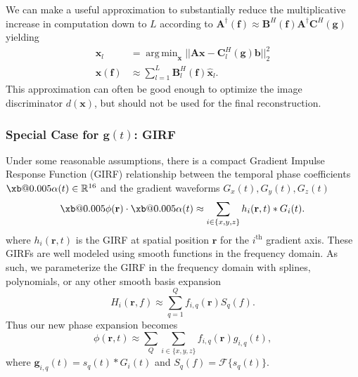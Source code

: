 \documentclass{article}
\makeatletter
\newcommand{\xbold}[2][0.005]{\mathpalette{\xb@{#1}}{#2}}
\newcommand{\xb@}[3]{%
  \sbox\z@{$\m@th#2\bm{#3}$}%
  \dimen@=#1\wd\z@
  \hbox{%
    \rlap{\kern-\dimen@\copy\z@}%
    \rlap{\kern\dimen@\copy\z@}%
    \rlap{\raise\dimen@\copy\z@}%
    \rlap{\lower\dimen@\copy\z@}%
    \copy\z@\kern\dimen@}%
}
\newcommand{\PHI}{\xbold{\phi}}
\newcommand{\ALPHA}{\xbold{\alpha}}
\DeclareMathOperator*{\argmin}{arg\,min}
\newcommand{\x}{\mathbf{x}}
\renewcommand{\r}{\mathbf{r}}
\newcommand{\f}{\mathbf{f}}
\newcommand{\g}{\mathbf{g}}
\newcommand{\A}{\mathbf{A}}
\newcommand{\C}{\mathbf{C}}
\newcommand{\B}{\mathbf{B}}
\renewcommand{\b}{\mathbf{b}}
\makeatother
\begin{document}
We can make a useful approximation to substantially reduce the multiplicative increase in computation down to $L$ according to $\A^\dagger (\f)\approx \B^H(\f) \A^\dagger \C^H(\g)$ yielding
\begin{align}
\hat{\x}_l &= \argmin_\x||\A \x - \C_l^H(\g) \b||_2^2 \\
\hat{\x}(\f) &\approx \sum_{l=1}^L \B_l^H(\f)\hat{\x}_l .
\end{align}
This approximation can often be good enough to optimize the image discriminator $d(\x)$, but should not be used for the final reconstruction.


\subsubsection{Special Case for $\g(t)$: GIRF}
Under some reasonable assumptions, there is a compact Gradient Impulse Response Function (GIRF) relationship between the temporal phase coefficients $\ALPHA(t) \in \mathbb{R}^{16}$ and the gradient waveforms $G_x(t), G_y(t), G_z(t)$
\begin{equation}
    \PHI(\r) \cdot \ALPHA(t) \approx \sum_{i \in \{x,y,z\}}h_i(\r, t) \ast G_i(t).
\end{equation}
where $h_i(\r, t)$ is the GIRF at spatial position $\r$ for the $i^\text{th}$ gradient axis. These GIRFs are well modeled using smooth functions in the frequency domain. As such, we parameterize the GIRF in the frequency domain with splines, polynomials, or any other smooth basis expansion
\begin{equation}
    H_i(\r, f) \approx \sum_{q=1}^Q f_{i,q}(\r) S_q(f).
\end{equation}
Thus our new phase expansion becomes
\begin{equation}
    \phi(\r, t) \approx \sum_Q \sum_{i \in \{x,y,z\}}  f_{i,q}(\r) g_{i,q}(t),
\end{equation}
where $\g_{i,q}(t) = s_q(t) \ast G_i(t)$ and $S_q(f) = \mathcal{F}\{s_q(t)\}$.
\end{document}
